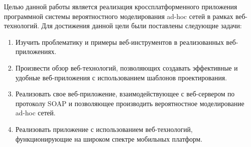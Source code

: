 Целью данной работы является реализация кроссплатформенного приложения программной системы вероятностного моделирования ad-hoc сетей в рамках веб-технологий. Для достижения данной цели были поставлены следующие задачи:
\begin{enumerate}
 \item Изучить проблематику и примеры веб-инструментов в реализованных веб-приложениях.
 \item Произвести обзор веб-технологий, позволяющих создавать эффективные и удобные веб-приложения с использованием шаблонов проектирования.
 \item Реализовать свое веб-приложение, взаимодействующее с веб-сервером по протоколу SOAP и позволяющее производить вероятностное моделирование ad-hoc сетей.
 \item Реализовать приложение с использованием веб-технологий, функционирующие на широком спектре мобильных платформ.
\end{enumerate}

\clearpage